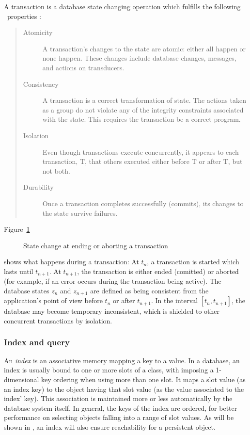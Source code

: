 A transaction is a database state changing operation which fulfills
the following \acid\ properties
\cite[]{bib:Gray-et-al-93}:
\begin{quote}\begin{description}
\item[Atomicity] A transaction's changes to the state are atomic:
  either all happen or none happen. These changes include database
  changes, messages, and actions on transducers.
\item[Consistency] A transaction is a correct transformation of
  state. The actions taken as a group do not violate any of the
  integrity constraints associated with the state. This requires the
  transaction be a correct program.
\item[{\hypertarget{link:Isolation}{Isolation}}] Even though
  transactions execute concurrently, it appears to each transaction,
  T, that others executed either before T or after T, but not both.
\item[Durability] Once a transaction completes successfully (commits),
  its changes to the state survive failures.
\end{description}\end{quote}
Figure~\ref{fig:TransactionStateChange}\ %
\begin{figure}[htbp]
\centerline{}
\caption{State change at ending or aborting a transaction}%
\label{fig:TransactionStateChange}
\end{figure}%
shows what happens during a transaction: At $t_n$, a transaction is
started which lasts until $t_{n+1}$. At $t_{n+1}$, the transaction is
either ended (comitted) or aborted (for example, if an error occurs
during the transaction being active). The database states $z_n$ and
$z_{n+1}$ are defined as being consistent from the application's point
of view before $t_n$ or after $t_{n+1}$. In the interval
$[t_n,t_{n+1}]$, the database may become temporary inconsistent, which
is shielded to other concurrent transactions by isolation.

\subsubsection{Index and query}

An \emph{index} is an associative memory mapping a key to a value.  In
a database, an index is usually bound to one or more slots of a class,
with imposing a 1-dimensional key ordering when using more than one
slot.  It maps a slot value (as an index key) to the object having
that slot value (as the value associated to the index' key).  This
association is maintained more or less automatically by the database
system itself.  In general, the keys of the index are ordered, for
better performance on selecting objects falling into a range of slot
values.  As will be shown in ,
an index will also ensure reachability for a persistent object.

